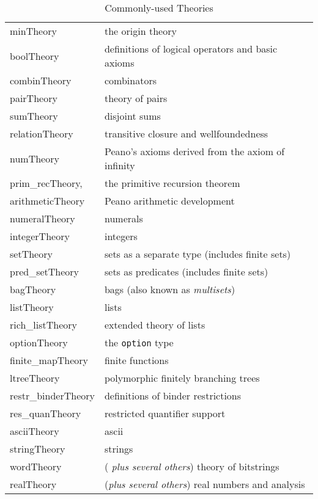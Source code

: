 \begin{table}
\begin{center}
\begin{tabular}{|l|l|} \hline
minTheory & the origin theory \\ boolTheory & definitions of logical
operators and basic axioms \\ combinTheory & combinators \\ pairTheory
& theory of pairs \\ sumTheory & disjoint sums \\ relationTheory &
transitive closure and wellfoundedness \\ numTheory & Peano's axioms
derived from the axiom of infinity \\ prim\_recTheory, & the primitive
recursion theorem \\ arithmeticTheory & Peano arithmetic development
\\ numeralTheory & numerals \\ integerTheory & integers \\ setTheory &
sets as a separate type (includes finite sets) \\ pred\_setTheory &
sets as predicates (includes finite sets) \\ bagTheory & bags (also
known as \emph{multisets})\\ listTheory & lists \\ rich\_listTheory &
extended theory of lists \\ optionTheory & the {\tt option} type \\
finite\_mapTheory & finite functions \\ ltreeTheory & polymorphic
finitely branching trees \\ restr\_binderTheory & definitions of
binder restrictions \\ res\_quanTheory & restricted quantifier support
\\ asciiTheory & ascii \\ stringTheory & strings \\ wordTheory & ({\it
plus several others}) theory of bitstrings \\ realTheory & ({\it plus
several others}) real numbers and analysis \\ \hline
\end{tabular}
\caption{Commonly-used Theories}\label{CommonTheories}
\end{center}
\end{table}




